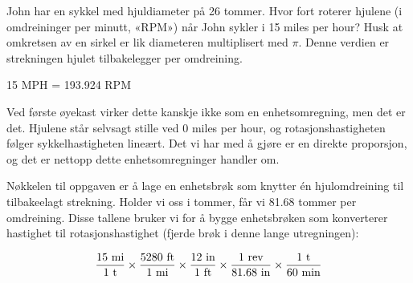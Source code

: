 
John har en sykkel med hjuldiameter på 26 tommer. Hvor fort roterer hjulene (i omdreininger per minutt, «RPM») når John sykler i 15 miles per hour? Husk at omkretsen av en sirkel er lik diameteren multiplisert med $\pi$. Denne verdien er strekningen hjulet tilbakelegger per omdreining.







15 MPH = 193.924 RPM

\vskip 10pt

Ved første øyekast virker dette kanskje ikke som en enhetsomregning, men det er det. Hjulene står selvsagt stille ved 0 miles per hour, og rotasjonshastigheten følger sykkelhastigheten lineært. Det vi har med å gjøre er en direkte proporsjon, og det er nettopp dette enhetsomregninger handler om.

Nøkkelen til oppgaven er å lage en enhetsbrøk som knytter én hjulomdreining til tilbakeelagt strekning. Holder vi oss i tommer, får vi 81.68 tommer per omdreining. Disse tallene bruker vi for å bygge enhetsbrøken som konverterer hastighet til rotasjonshastighet (fjerde brøk i denne lange utregningen):

$${15 \hbox{ mi} \over 1 \hbox{ t}} \times {5280 \hbox{ ft} \over 1 \hbox{ mi}} \times {12 \hbox{ in} \over 1 \hbox{ ft}} \times {1 \hbox{ rev} \over 81.68 \hbox{ in}} \times {1 \hbox{ t} \over 60 \hbox{ min}}$$









